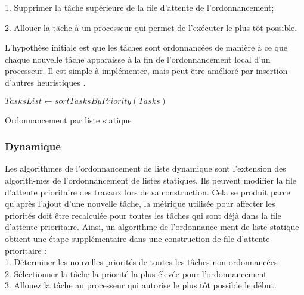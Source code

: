 1. Supprimer la tâche supérieure de la file d'attente de l'ordonnancement; 

2. Allouer la tâche à un processeur qui permet de l'exécuter le plus tôt possible. 

L'hypothèse initiale est que les tâches sont ordonnancées de manière à ce que chaque nouvelle tâche apparaisse à la fin de l’ordonnancement local d'un processeur. 
Il est simple à implémenter, mais peut être amélioré par insertion d’autres heuristiques \cite {KRU87}. 
\IncMargin{1em}
\begin{algorithm}

%

\BlankLine   %

$TasksList \gets sortTasksByPriority(Tasks)$ \;

%
\caption{Ordonnancement par liste statique}
\label{algo_static_scheduling}
\end{algorithm}
\DecMargin{1em}
\subsubsection{Dynamique}
%
Les algorithmes de l'ordonnancement de liste dynamique sont l'extension des algorith-mes de l'ordonnancement de listes statiques. 
Ils peuvent modifier la file d'attente prioritaire des travaux lors de sa construction. 
Cela se produit parce qu'après l'ajout d'une nouvelle tâche, la métrique utilisée pour affecter les priorités doit être recalculée pour toutes les tâches qui sont déjà dans la file d'attente prioritaire. 
Ainsi, un algorithme de l'ordonnance-ment de liste statique obtient une étape supplémentaire dans une construction de file d'attente prioritaire \cite{KA99}: \\
1. Déterminer les nouvelles priorités de toutes les tâches non ordonnancées\\
2. Sélectionner la tâche la priorité la plus élevée pour l’ordonnancement\\ 
3. Allouez la tâche au processeur qui autorise le plus tôt possible le début. 


